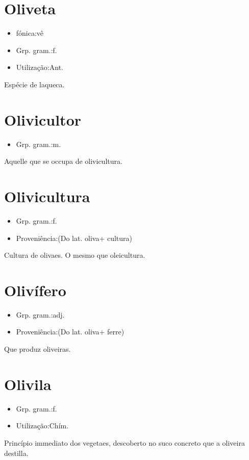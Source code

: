 \section{Oliveta}
\begin{itemize}
\item {fónica:vê}
\end{itemize}
\begin{itemize}
\item {Grp. gram.:f.}
\end{itemize}
\begin{itemize}
\item {Utilização:Ant.}
\end{itemize}
Espécie de laqueca.
\section{Olivicultor}
\begin{itemize}
\item {Grp. gram.:m.}
\end{itemize}
Aquelle que se occupa de olivicultura.
\section{Olivicultura}
\begin{itemize}
\item {Grp. gram.:f.}
\end{itemize}
\begin{itemize}
\item {Proveniência:(Do lat. \textunderscore oliva\textunderscore  + \textunderscore cultura\textunderscore )}
\end{itemize}
Cultura de olivaes.
O mesmo que \textunderscore oleicultura\textunderscore .
\section{Olivífero}
\begin{itemize}
\item {Grp. gram.:adj.}
\end{itemize}
\begin{itemize}
\item {Proveniência:(Do lat. \textunderscore oliva\textunderscore  + \textunderscore ferre\textunderscore )}
\end{itemize}
Que produz oliveiras.
\section{Olivila}
\begin{itemize}
\item {Grp. gram.:f.}
\end{itemize}
\begin{itemize}
\item {Utilização:Chím.}
\end{itemize}
Princípio immediato dos vegetaes, descoberto no suco concreto que a oliveira destilla.
